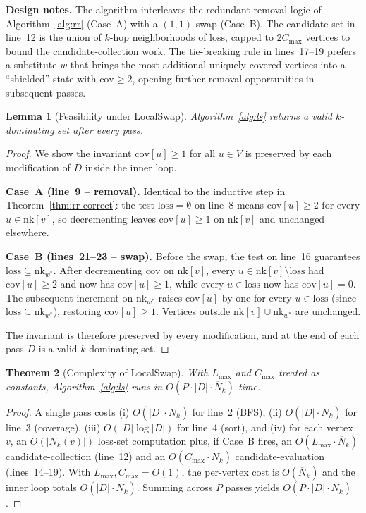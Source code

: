 \documentclass[11pt,a4paper]{article}
\newtheorem{theorem}{Theorem}
\newtheorem{lemma}[theorem]{Lemma}
\newcommand{\Nk}{\overline{N}_k}
\newcommand{\cov}{\mathrm{cov}}
\newcommand{\loss}{\mathrm{loss}}
\begin{document}
\textbf{Design notes.}
The algorithm interleaves the redundant-removal logic of
Algorithm~\ref{alg:rr} (Case~A) with a $(1,1)$-swap (Case~B). The
candidate set in line~12 is the union of $k$-hop neighborhoods of
$\loss$, capped to $2C_{\max}$ vertices to bound the candidate-collection
work. The tie-breaking rule in lines~17--19 prefers a substitute $w$
that brings the most additional uniquely covered vertices into a
``shielded'' state with $\cov\ge 2$, opening further removal opportunities
in subsequent passes.

\begin{lemma}[Feasibility under LocalSwap]
\label{lem:ls-correct}
Algorithm~\ref{alg:ls} returns a valid $k$-dominating set after every
pass.
\end{lemma}

\begin{proof}
We show the invariant $\cov[u]\ge 1$ for all $u\in V$ is preserved by
each modification of $D$ inside the inner loop.

\textbf{Case~A (line~9 -- removal).} Identical to the inductive step in
Theorem~\ref{thm:rr-correct}: the test $\loss=\emptyset$ on line~8 means
$\cov[u]\ge 2$ for every $u\in\text{nk}[v]$, so decrementing leaves
$\cov[u]\ge 1$ on $\text{nk}[v]$ and unchanged elsewhere.

\textbf{Case~B (lines~21--23 -- swap).} Before the swap, the test on
line~16 guarantees $\loss\subseteq\text{nk}_{w^*}$. After decrementing
$\cov$ on $\text{nk}[v]$, every $u\in\text{nk}[v]\setminus\loss$ had
$\cov[u]\ge 2$ and now has $\cov[u]\ge 1$, while every $u\in\loss$ now
has $\cov[u]=0$. The subsequent increment on $\text{nk}_{w^*}$ raises
$\cov[u]$ by one for every $u\in\loss$ (since $\loss\subseteq\text{nk}_{w^*}$),
restoring $\cov[u]\ge 1$. Vertices outside $\text{nk}[v]\cup\text{nk}_{w^*}$
are unchanged.

The invariant is therefore preserved by every modification, and at the
end of each pass $D$ is a valid $k$-dominating set.
\end{proof}

\begin{theorem}[Complexity of LocalSwap]
\label{thm:ls-complexity}
With $L_{\max}$ and $C_{\max}$ treated as constants, Algorithm~\ref{alg:ls}
runs in $O(P\cdot|D|\cdot\Nk)$ time.
\end{theorem}

\begin{proof}
A single pass costs (i) $O(|D|\cdot\Nk)$ for line~2 (BFS),
(ii) $O(|D|\cdot\Nk)$ for line~3 (coverage), (iii) $O(|D|\log|D|)$ for
line~4 (sort), and (iv) for each vertex $v$, an $O(|N_k(v)|)$
loss-set computation plus, if Case~B fires, an
$O(L_{\max}\cdot\Nk)$ candidate-collection (line~12) and an
$O(C_{\max}\cdot\Nk)$ candidate-evaluation (lines~14--19). With
$L_{\max},C_{\max}=O(1)$, the per-vertex cost is $O(\Nk)$ and the
inner loop totals $O(|D|\cdot\Nk)$. Summing across $P$ passes yields
$O(P\cdot|D|\cdot\Nk)$.
\end{proof}
\end{document}
